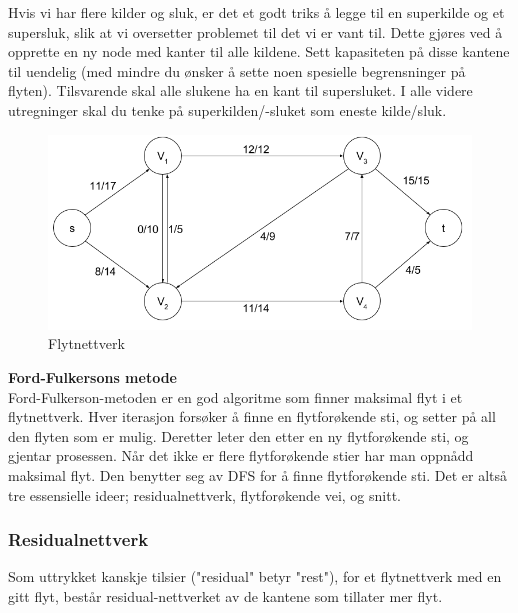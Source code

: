 \noindent Hvis vi har flere kilder og sluk, er det et godt triks å legge til en superkilde og et supersluk, slik at vi oversetter problemet til det vi er vant til. Dette gjøres ved å opprette en ny node med kanter til alle kildene. Sett kapasiteten på disse kantene til uendelig (med mindre du ønsker å sette noen spesielle begrensninger på flyten). Tilsvarende skal alle slukene ha en kant til supersluket. I alle videre utregninger skal du tenke på superkilden/-sluket som eneste kilde/sluk.

\begin{figure}[H]
\includegraphics[scale=0.6]{images/flytnettverk}
\centering %
\caption{Flytnettverk}
\label{fig:flytnettverk}
\end{figure}

\noindent \textbf{Ford-Fulkersons metode}\\
Ford-Fulkerson-metoden er en god algoritme som finner maksimal flyt i et flytnettverk. Hver iterasjon forsøker å finne en flytforøkende sti, og setter på all den flyten som er mulig. Deretter leter den etter en ny flytforøkende sti, og gjentar prosessen. Når det ikke er flere flytforøkende stier har man oppnådd maksimal flyt. Den benytter seg av DFS for å finne flytforøkende sti. Det er altså tre essensielle ideer; residualnettverk, flytforøkende vei, og snitt.\\

\subsubsection{Residualnettverk}
Som uttrykket kanskje tilsier ("residual" betyr "rest"), for et flytnettverk med en gitt flyt, består residual-nettverket av de kantene som tillater mer flyt.


